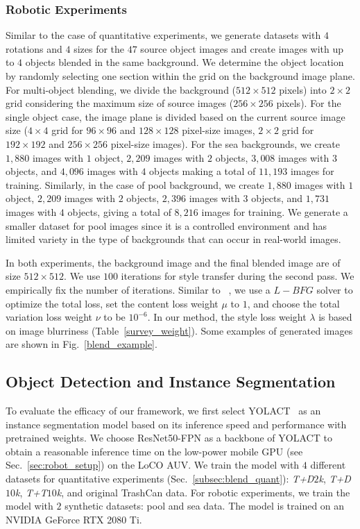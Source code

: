 \subsubsection{Robotic Experiments}
Similar to the case of quantitative experiments, we generate datasets with $4$ rotations and $4$ sizes for the $47$ source object images and create images with up to $4$ objects blended in the same background.
We determine the object location by randomly selecting one section within the grid on the background image plane. 
For multi-object blending, we divide the background ($512\times512$ pixels) into $2\times2$ grid considering the maximum size of source images (\ie $256\times256$ pixels). 
For the single object case, the image plane is divided based on the current source image size (\ie $4\times4$ grid for $96\times96$ and $128\times128$ pixel-size images, $2\times2$ grid for $192\times192$ and $256\times256$ pixel-size images). 
For the sea backgrounds, we create $1,880$ images with $1$ object, $2,209$ images with $2$ objects, $3,008$ images with $3$ objects, and $4,096$ images with $4$ objects making a total of $11,193$ images for training. 
Similarly, in the case of pool background, we create $1,880$ images with $1$ object, $2,209$ images with $2$ objects, $2,396$ images with $3$ objects, and $1,731$ images with $4$ objects, giving a total of $8,216$ images for training. 
We generate a smaller dataset for pool images since it is a controlled environment and has limited variety in the type of backgrounds that can occur in real-world images.





In both experiments, the background image and the final blended image are of size $512\times512$. We use $100$ iterations for style transfer during the second pass. We empirically fix the number of iterations. Similar to ~\cite{zhang_deep_2020}, we use a $L-BFG$ solver to optimize the total loss, set the content loss weight $\mu$ to $1$, and choose the total variation loss weight $\nu$ to be $10^{-6}$. In our method, the style loss weight $\lambda$ is based on image blurriness (Table~\ref{survey_weight}). Some examples of generated images are shown in Fig.~\ref{blend_example}.

 

\subsection{Object Detection and Instance Segmentation}
To evaluate the efficacy of our framework, we first select YOLACT~\cite{bolya2019yolact} as an instance segmentation model based on its inference speed and performance with pretrained weights. 
We choose ResNet50-FPN as a backbone of YOLACT to obtain a reasonable inference time on the low-power mobile GPU (see Sec.~\ref{sec:robot_setup}) on the LoCO AUV.
We train the model with $4$ different datasets for quantitative experiments (Sec.~\ref{subsec:blend_quant}): \textit{T+D$2$k}, \textit{T+D$10$k}, \textit{T+T$10$k}, and original TrashCan data. For robotic experiments, we train the model with $2$ synthetic datasets: pool and sea data. The model is trained on an NVIDIA GeForce RTX 2080 Ti. 


